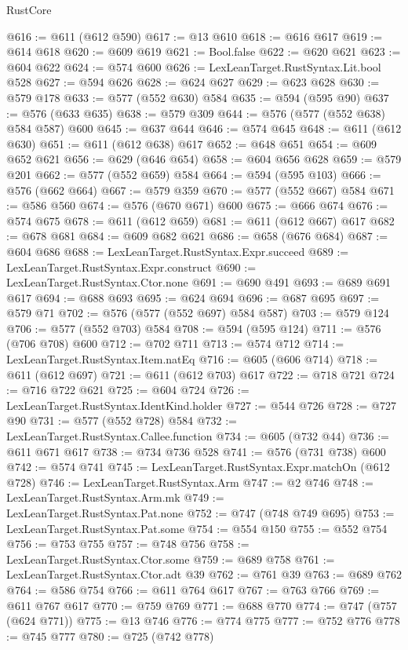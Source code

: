 \begin{lexlean}{RustCore}
\begin{coremodule}
@616 := @611 (@612 @590)
@617 := @13 @610
@618 := @616 @617
@619 := @614 @618
@620 := @609 @619
@621 := Bool.false
@622 := @620 @621
@623 := @604 @622
@624 := @574 @600
@626 := LexLeanTarget.RustSyntax.Lit.bool @528
@627 := @594 @626
@628 := @624 @627
@629 := @623 @628
@630 := @579 @178
@633 := @577 (@552 @630) @584
@635 := @594 (@595 @90)
@637 := @576 (@633 @635)
@638 := @579 @309
@644 := @576 (@577 (@552 @638) @584 @587) @600
@645 := @637 @644
@646 := @574 @645
@648 := @611 (@612 @630)
@651 := @611 (@612 @638) @617
@652 := @648 @651
@654 := @609 @652 @621
@656 := @629 (@646 @654)
@658 := @604 @656 @628
@659 := @579 @201
@662 := @577 (@552 @659) @584
@664 := @594 (@595 @103)
@666 := @576 (@662 @664)
@667 := @579 @359
@670 := @577 (@552 @667) @584
@671 := @586 @560
@674 := @576 (@670 @671) @600
@675 := @666 @674
@676 := @574 @675
@678 := @611 (@612 @659)
@681 := @611 (@612 @667) @617
@682 := @678 @681
@684 := @609 @682 @621
@686 := @658 (@676 @684)
@687 := @604 @686
@688 := LexLeanTarget.RustSyntax.Expr.succeed
@689 := LexLeanTarget.RustSyntax.Expr.construct
@690 := LexLeanTarget.RustSyntax.Ctor.none
@691 := @690 @491
@693 := @689 @691 @617
@694 := @688 @693
@695 := @624 @694
@696 := @687 @695
@697 := @579 @71
@702 := @576 (@577 (@552 @697) @584 @587)
@703 := @579 @124
@706 := @577 (@552 @703) @584
@708 := @594 (@595 @124)
@711 := @576 (@706 @708) @600
@712 := @702 @711
@713 := @574 @712
@714 := LexLeanTarget.RustSyntax.Item.natEq
@716 := @605 (@606 @714)
@718 := @611 (@612 @697)
@721 := @611 (@612 @703) @617
@722 := @718 @721
@724 := @716 @722 @621
@725 := @604 @724
@726 := LexLeanTarget.RustSyntax.IdentKind.holder
@727 := @544 @726
@728 := @727 @90
@731 := @577 (@552 @728) @584
@732 := LexLeanTarget.RustSyntax.Callee.function
@734 := @605 (@732 @44)
@736 := @611 @671 @617
@738 := @734 @736 @528
@741 := @576 (@731 @738) @600
@742 := @574 @741
@745 := LexLeanTarget.RustSyntax.Expr.matchOn (@612 @728)
@746 := LexLeanTarget.RustSyntax.Arm
@747 := @2 @746
@748 := LexLeanTarget.RustSyntax.Arm.mk
@749 := LexLeanTarget.RustSyntax.Pat.none
@752 := @747 (@748 @749 @695)
@753 := LexLeanTarget.RustSyntax.Pat.some
@754 := @554 @150
@755 := @552 @754
@756 := @753 @755
@757 := @748 @756
@758 := LexLeanTarget.RustSyntax.Ctor.some
@759 := @689 @758
@761 := LexLeanTarget.RustSyntax.Ctor.adt @39
@762 := @761 @39
@763 := @689 @762
@764 := @586 @754
@766 := @611 @764 @617
@767 := @763 @766
@769 := @611 @767 @617
@770 := @759 @769
@771 := @688 @770
@774 := @747 (@757 (@624 @771))
@775 := @13 @746
@776 := @774 @775
@777 := @752 @776
@778 := @745 @777
@780 := @725 (@742 @778)

\end{coremodule}
\end{lexlean}
